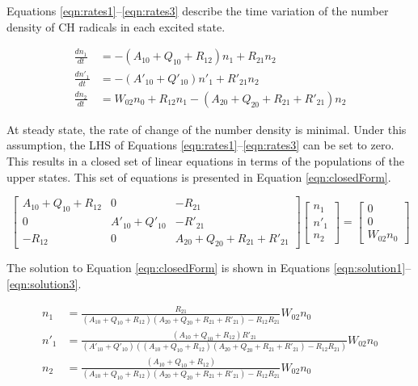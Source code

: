 

Equations \ref{eqn:rates1}--\ref{eqn:rates3} describe the time variation of the number density of CH radicals in each excited state.

\begin{align}
\frac{dn_1}{dt} &= -( A_{10} + Q_{10} + R_{12} )n_1 + R_{21}n_2
\label{eqn:rates1}\\
\frac{dn'_1}{dt} &= -( A'_{10} + Q'_{10} )n'_1 + R'_{21}n_2
\label{eqn:rates2}\\
\frac{dn_2}{dt} &= W_{02}n_0 + R_{12}n_1 - ( A_{20} + Q_{20} + R_{21} + R'_{21} )n_2
\label{eqn:rates3}
\end{align}

At steady state, the rate of change of the number density is minimal.
Under this assumption, the LHS of Equations \ref{eqn:rates1}--\ref{eqn:rates3} can be set to zero.
This results in a closed set of linear equations in terms of the populations of the upper states.
This set of equations is presented in Equation \ref{eqn:closedForm}.

\begin{equation}
  \left[
    \begin{matrix}
      A_{10} + Q_{10} + R_{12} & 0 & -R_{21}\\
      0 & A'_{10} + Q'_{10} & -R'_{21}\\
      -R_{12} & 0 & A_{20} + Q_{20} + R_{21} + R'_{21}
    \end{matrix}
  \right]\left[
    \begin{matrix}
      n_1\\
      n'_1\\
      n_2
    \end{matrix}
  \right] = \left[
    \begin{matrix}
      0\\
      0\\
      W_{02}n_0
    \end{matrix}
  \right]
  \label{eqn:closedForm}
\end{equation}

The solution to Equation \ref{eqn:closedForm} is shown in Equations \ref{eqn:solution1}--\ref{eqn:solution3}.

\begin{align}
  n_1 &= \frac{ R_{21} }{ ( A_{10} + Q_{10} + R_{12} )( A_{20} + Q_{20} + R_{21} + R'_{21} ) - R_{12}R_{21} }W_{02}n_0
  \label{eqn:solution1}\\
  n'_1 &= \frac{ ( A_{10} + Q_{10} + R_{12} )R'_{21} }{ ( A'_{10} + Q'_{10} ) ( ( A_{10} + Q_{10} + R_{12} )( A_{20} + Q_{20} + R_{21} + R'_{21} ) - R_{12}R_{21} ) }W_{02}n_0
  \label{eqn:solution2}\\
  n_2 &= \frac{ ( A_{10} + Q_{10} + R_{12} ) }{ ( A_{10} + Q_{10} + R_{12} )( A_{20} + Q_{20} + R_{21} + R'_{21} ) - R_{12}R_{21} }W_{02}n_0
  \label{eqn:solution3}
\end{align}

